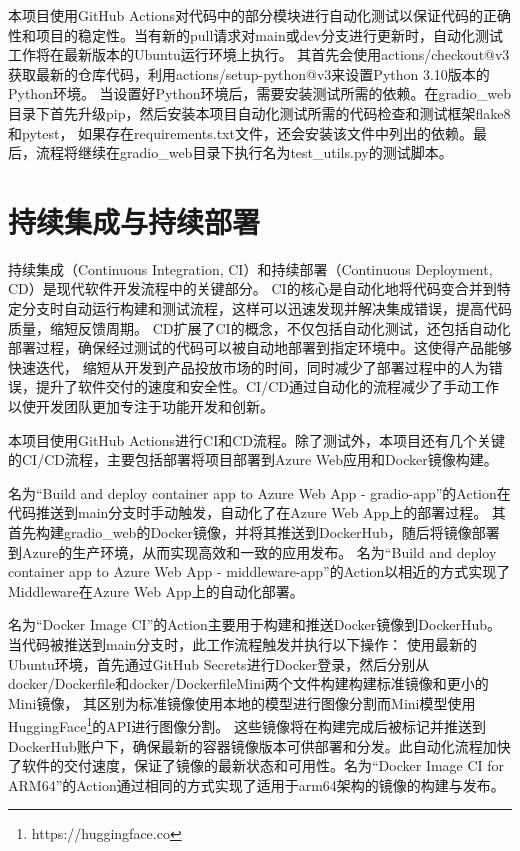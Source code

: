 \documentclass[a4paper,AutoFakeBold,oneside,12pt]{book}
\begin{document}
本项目使用GitHub Actions对代码中的部分模块进行自动化测试以保证代码的正确性和项目的稳定性。当有新的pull请求对main或dev分支进行更新时，自动化测试工作将在最新版本的Ubuntu运行环境上执行。
其首先会使用actions/checkout@v3获取最新的仓库代码，利用actions/setup-python@v3来设置Python 3.10版本的Python环境。
当设置好Python环境后，需要安装测试所需的依赖。在gradio\_web目录下首先升级pip，然后安装本项目自动化测试所需的代码检查和测试框架flake8和pytest，
如果存在requirements.txt文件，还会安装该文件中列出的依赖。最后，流程将继续在gradio\_web目录下执行名为test\_utils.py的测试脚本。

\section{持续集成与持续部署}
持续集成（Continuous Integration, CI）和持续部署（Continuous Deployment, CD）是现代软件开发流程中的关键部分。
CI的核心是自动化地将代码变合并到特定分支时自动运行构建和测试流程，这样可以迅速发现并解决集成错误，提高代码质量，缩短反馈周期。
CD扩展了CI的概念，不仅包括自动化测试，还包括自动化部署过程，确保经过测试的代码可以被自动地部署到指定环境中。这使得产品能够快速迭代，
缩短从开发到产品投放市场的时间，同时减少了部署过程中的人为错误，提升了软件交付的速度和安全性。CI/CD通过自动化的流程减少了手动工作以使开发团队更加专注于功能开发和创新。

本项目使用GitHub Actions进行CI和CD流程。除了测试外，本项目还有几个关键的CI/CD流程，主要包括部署将项目部署到Azure Web应用和Docker镜像构建。

名为“Build and deploy container app to Azure Web App - gradio-app”的Action在代码推送到main分支时手动触发，自动化了在Azure Web App上的部署过程。
其首先构建gradio\_web的Docker镜像，并将其推送到DockerHub，随后将镜像部署到Azure的生产环境，从而实现高效和一致的应用发布。
名为“Build and deploy container app to Azure Web App - middleware-app”的Action以相近的方式实现了Middleware在Azure Web App上的自动化部署。

名为“Docker Image CI”的Action主要用于构建和推送Docker镜像到DockerHub。当代码被推送到main分支时，此工作流程触发并执行以下操作：
使用最新的Ubuntu环境，首先通过GitHub Secrets进行Docker登录，然后分别从docker/Dockerfile和docker/DockerfileMini两个文件构建构建标准镜像和更小的Mini镜像，
其区别为标准镜像使用本地的模型进行图像分割而Mini模型使用HuggingFace\footnote{https://huggingface.co}的API进行图像分割。
这些镜像将在构建完成后被标记并推送到DockerHub账户下，确保最新的容器镜像版本可供部署和分发。此自动化流程加快了软件的交付速度，保证了镜像的最新状态和可用性。名为“Docker Image CI for ARM64”的Action通过相同的方式实现了适用于arm64架构的镜像的构建与发布。
\end{document}
